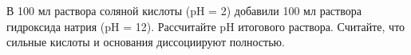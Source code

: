 В 100 мл раствора соляной кислоты (pH = 2) добавили 100 мл раствора гидроксида натрия (pH = 12). Рассчитайте pH итогового раствора. Считайте, что сильные кислоты и основания диссоциируют полностью. 

